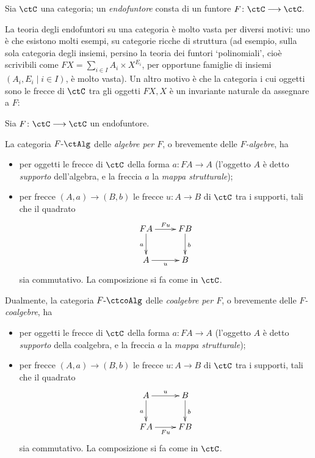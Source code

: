 \begin{definition}[Endofuntore]\label{def_endofuntore}
 Sia \(\ctC\) una categoria; un \emph{endofuntore} consta di un funtore \(F \colon \ctC\fun\ctC\).
\end{definition}
La teoria degli endofuntori su una categoria è molto vasta per diversi motivi: uno è che esistono molti esempi, su categorie ricche di struttura (ad esempio, sulla sola categoria degli insiemi, persino la teoria dei funtori `polinomiali', cioè scrivibili come \(FX = \sum_{i\in I} A_i\times X^{E_i}\), per opportune famiglie di insiemi \((A_i,E_i\mid i\in I)\), è molto vasta). Un altro motivo è che la categoria i cui oggetti sono le frecce di \(\ctC\) tra gli oggetti \(FX , X\) è un invariante naturale da assegnare a \(F\):
\begin{definition}
 Sia \(F \colon \ctC\fun\ctC\) un endofuntore.

 La categoria \(\falg F\) delle \emph{algebre per \(F\)}, o brevemente delle \emph{\(F\)-algebre}, ha
 \begin{itemize}
  \item per oggetti le frecce di \(\ctC\) della forma \(a \colon FA\to A\) (l'oggetto \(A\) è detto \emph{supporto} dell'algebra, e la freccia \(a\) la \emph{mappa strutturale});
  \item per frecce \((A,a)\to (B,b)\) le frecce \(u \colon A\to B\) di \(\ctC\) tra i supporti, tali che il quadrato
        \[\xymatrix{
          FA \ar[r]^{Fu}\ar[d]_a & FB \ar[d]^b\\
          A \ar[r]_-u & B
         }\]
        sia commutativo. La composizione si fa come in \(\ctC\).
 \end{itemize}
 Dualmente, la categoria \(\fcoalg F\) delle \emph{coalgebre per \(F\)}, o brevemente delle \emph{\(F\)-coalgebre}, ha
 \begin{itemize}
  \item per oggetti le frecce di \(\ctC\) della forma \(a \colon FA\to A\) (l'oggetto \(A\) è detto \emph{supporto} della coalgebra, e la freccia \(a\) la \emph{mappa strutturale});
  \item per frecce \((A,a)\to (B,b)\) le frecce \(u \colon A\to B\) di \(\ctC\) tra i supporti, tali che il quadrato
        \[\xymatrix{
          A \ar[d]_a\ar[r]^-u & B\ar[d]^b\\
          FA \ar[r]_{Fu} & FB
         }\]
        sia commutativo. La composizione si fa come in \(\ctC\).
 \end{itemize}
\end{definition}
